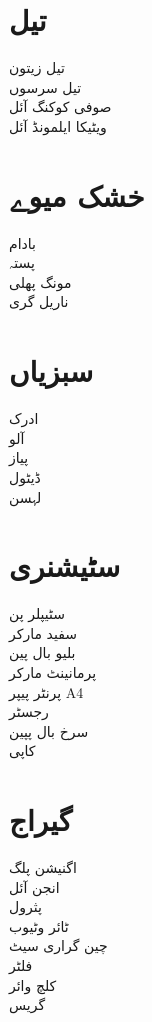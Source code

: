 \documentclass[a4paper,11pt]{article}
\begin{document}
\begin{multicols}{6}
\section*{تیل}
تیل زیتون \\
تیل سرسوں  \\
صوفی کوکنگ آئل \\
ویٹیکا ایلمونڈ آئل 
 
\section*{خشک میوے}
بادام \\
پستہ \\
مونگ پھلی \\
ناریل گری
\section*{سبزیاں}
ادرک \\
آلو \\
پیاز \\
ڈیٹول \\
لہسن
\section*{سٹیشنری}
سٹیپلر پن \\
سفید مارکر \\
بلیو بال پین \\
پرمانینٹ مارکر \\
پرنٹر پیپر A4 \\
رجسٹر \\
سرخ بال پپین \\
کاپی 
 
\section*{گیراج}
 
اگنیشن پلگ \\
انجن آئل \\
پثرول \\
ٹائر وٹیوب \\
چین گراری سیٹ \\
فلٹر \\
کلچ وائر \\
گریس

\end{multicols}
\end{document}
